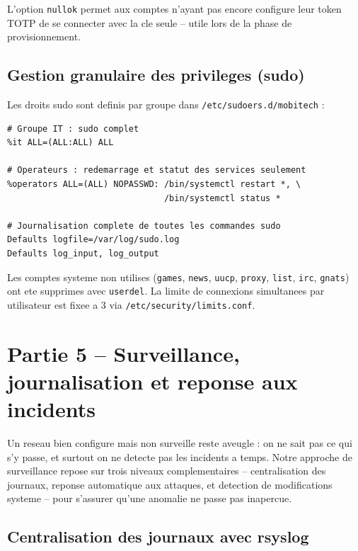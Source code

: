\documentclass[11pt,a4paper]{article}
\begin{document}
L'option \texttt{nullok} permet aux comptes n'ayant pas encore configure leur token TOTP de se connecter avec la cle seule -- utile lors de la phase de provisionnement.

\subsection{Gestion granulaire des privileges (sudo)}

Les droits sudo sont definis par groupe dans \texttt{/etc/sudoers.d/mobitech} :

\begin{lstlisting}[caption={/etc/sudoers.d/mobitech}]
# Groupe IT : sudo complet
%it ALL=(ALL:ALL) ALL

# Operateurs : redemarrage et statut des services seulement
%operators ALL=(ALL) NOPASSWD: /bin/systemctl restart *, \
                               /bin/systemctl status *

# Journalisation complete de toutes les commandes sudo
Defaults logfile=/var/log/sudo.log
Defaults log_input, log_output
\end{lstlisting}

Les comptes systeme non utilises (\texttt{games}, \texttt{news}, \texttt{uucp}, \texttt{proxy}, \texttt{list}, \texttt{irc}, \texttt{gnats}) ont ete supprimes avec \texttt{userdel}. La limite de connexions simultanees par utilisateur est fixee a 3 via \texttt{/etc/security/limits.conf}.

\section{Partie 5 -- Surveillance, journalisation et reponse aux incidents}

Un reseau bien configure mais non surveille reste aveugle : on ne sait pas ce qui s'y passe, et surtout on ne detecte pas les incidents a temps. Notre approche de surveillance repose sur trois niveaux complementaires -- centralisation des journaux, reponse automatique aux attaques, et detection de modifications systeme -- pour s'assurer qu'une anomalie ne passe pas inapercue.

\subsection{Centralisation des journaux avec rsyslog}
\end{document}
